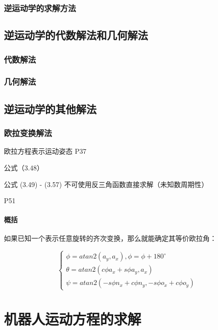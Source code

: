 \documentclass[11pt]{book}
\begin{document}
\subsubsection{逆运动学的求解方法}

\subsection{逆运动学的代数解法和几何解法}

\subsubsection{代数解法}


\subsubsection{几何解法}

\subsection{逆运动学的其他解法}

\subsubsection{欧拉变换解法}

欧拉方程表示运动姿态 P37

公式（3.48）

公式 (3.49) - (3.57) 
不可使用反三角函数直接求解（未知数周期性）

P51

\paragraph{概括}

如果已知一个表示任意旋转的齐次变换，那么就能确定其等价欧拉角：

\begin{equation}
    \left\{
        \begin{array}{ll}
           \phi = atan2(a_y, a_x), \phi = \phi + 180 ^ \circ \\
           \theta = atan2(c\phi a_x + s \phi a_y, a_x) \\
           \psi = atan2(-s \phi n_x + c \phi n_y, -s \phi o_x + c \phi o_y)
        \end{array}
    \right.
\end{equation}

\section{机器人运动方程的求解}
\end{document}

